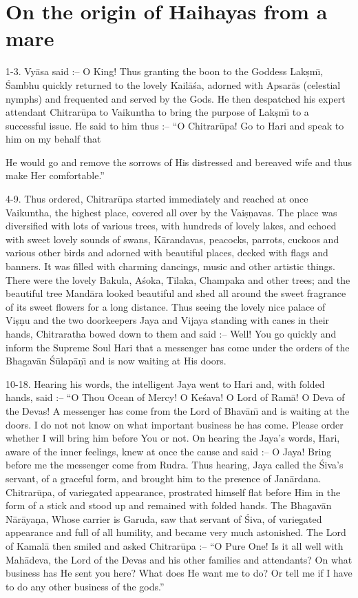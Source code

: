 \chapter{On the origin of Haihayas from a mare}

1-3. Vy\=asa said :-- O King! Thus granting the boon to the Goddess Lak\d{s}m\={\i}, \'Sambhu quickly returned to the lovely Kail\=a\'sa, adorned with Apsar\=as (celestial nymphs) and frequented and served by the Gods. He then despatched his expert attendant Chitrar\=upa to Vaikuntha to bring the purpose of Lak\d{s}m\={\i} to a successful issue. He said to him thus :-- ``O Chitrar\=upa! Go to Hari and speak to him on my behalf that

He would go and remove the sorrows of His distressed and bereaved wife and thus make Her comfortable.''

4-9. Thus ordered, Chitrar\=upa started immediately and reached at once Vaikuntha, the highest place, covered all over by the Vai\d{s}\d{n}avas. The place was diversified with lots of various trees, with hundreds of lovely lakes, and echoed with sweet lovely sounds of swans, K\=arandavas, peacocks, parrots, cuckoos and various other birds and adorned with beautiful places, decked with flags and banners. It was filled with charming dancings, music and other artistic things. There were the lovely Bakula, A\'soka, Tilaka, Champaka and other trees; and the beautiful tree Mand\=ara looked beautiful and shed all around the sweet fragrance of its sweet flowers for a long distance. Thus seeing the lovely nice palace of Vi\d{s}\d{n}u and the two doorkeepers Jaya and Vijaya standing with canes in their hands, Chitraratha bowed down to them and said :-- Well! You go quickly and inform the Supreme Soul Hari that a messenger has come under the orders of the Bhagav\=an \'S\=ulap\=a\d{n}\={\i} and is now waiting at His doors.

10-18. Hearing his words, the intelligent Jaya went to Hari and, with folded hands, said :-- ``O Thou Ocean of Mercy! O Ke\'sava! O Lord of Ram\=a! O Deva of the Devas! A messenger has come from the Lord of Bhav\=an\={\i} and is waiting at the doors. I do not not know on what important business he has come. Please order whether I will bring him before You or not. On hearing the Jaya's words, Hari, aware of the inner feelings, knew at once the cause and said :-- O Jaya! Bring before me the messenger come from Rudra. Thus hearing, Jaya called the \'Siva's servant, of a graceful form, and brought him to the presence of Jan\=ardana. Chitrar\=upa, of variegated appearance, prostrated himself flat before Him in the form of a stick and stood up and remained with folded hands. The Bhagav\=an N\=ar\=aya\d{n}a, Whose carrier is Garuda, saw that servant of \'Siva, of variegated appearance and full of all humility, and became very much astonished. The Lord of Kamal\=a then smiled and asked Chitrar\=upa :-- ``O Pure One! Is it all well with Mah\=adeva, the Lord of the Devas and his other families and attendants? On what business has He sent you here? What does He want me to do? Or tell me if I have to do any other business of the gods.''

